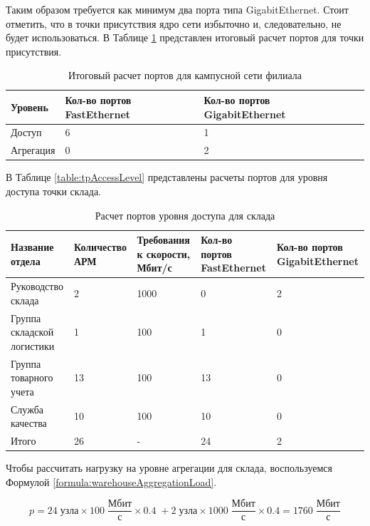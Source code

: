 \documentclass[14pt, a4paper]{extarticle}
\numberwithin{equation}{section}
\begin{document}
Таким образом требуется как минимум два порта типа GigabitEthernet.
Стоит отметить, что в точки присутствия ядро сети избыточно и, 
следовательно, не будет использоваться.
В Таблице \ref{table:filialCampusNet} представлен итоговый расчет портов для точки присутствия.

\begin{table}[H]
\centering
\small
\caption{Итоговый расчет портов для кампусной сети филиала}
\begin{tabular}{|m{2cm}|m{4cm}|m{3cm}|m{3.5cm}|}
\hline
\textbf{Уровень} & \textbf{Кол-во портов FastEthernet} & \textbf{Кол-во портов GigabitEthernet} \\
\hline
Доступ & 6 & 1 \\
\hline
Агрегация & 0 & 2 \\
\hline
\end{tabular}
\label{table:filialCampusNet}
\end{table}


В Таблице \ref{table:tpAccessLevel} представлены расчеты портов для уровня доступа 
точки склада.

\begin{table}[H]
\centering
\small
\caption{Расчет портов уровня доступа для склада}
\begin{tabular}{|m{3cm}|m{2.5cm}|m{2.5cm}|m{2.5cm}|m{3cm}|}
\hline
\textbf{Название отдела} & \textbf{Количество АРМ} & \textbf{Требования к скорости, Мбит/с} & \textbf{Кол-во портов FastEthernet} & \textbf{Кол-во портов GigabitEthernet} \\
\hline
Руководство склада & 2 & 1000 & 0 & 2 \\
\hline
Группа складской логистики & 1 & 100 & 1 & 0 \\
\hline
Группа товарного учета & 13 & 100 & 13 & 0 \\
\hline
Служба качества & 10 & 100 & 10 & 0 \\
\hline
Итого & 26 & - & 24 & 2 \\
\hline
\end{tabular}
\label{table:warehouseAccessLevel}
\end{table}

Чтобы рассчитать нагрузку на уровне агрегации для 
склада, воспользуемся Формулой \ref{formula:warehouseAggregationLoad}.

\begin{equation}
p = 24 \; \text{узла} \times 100\;\frac{\text{Мбит}}{\text{с}} \times 0.4 \; + 2 \; \text{узла} \times 1000\;\frac{\text{Мбит}}{\text{с}} \times 0.4 = 1760\;\frac{\text{Мбит}}{\text{с}}
\label{formula:warehouseAggregationLoad}
\end{equation}
\end{document}
